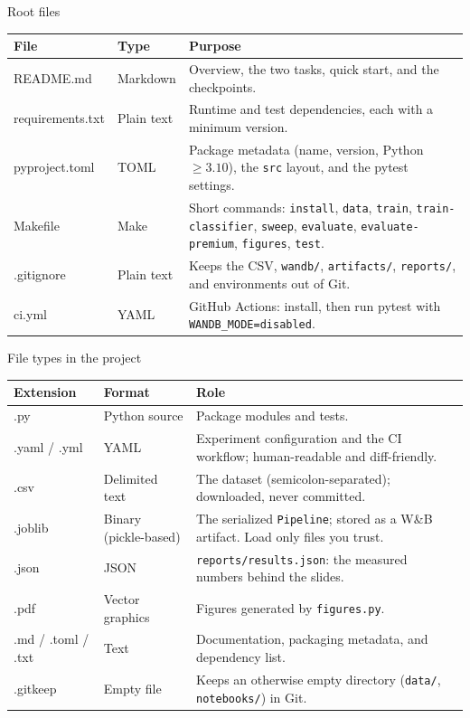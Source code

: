 \begin{frame}{Root files}
\begingroup\footnotesize
\begin{tabularx}{\textwidth}{>{\ttfamily}l l X}
\normalfont\bfseries File & \bfseries Type & \bfseries Purpose \\
\toprule
README.md & Markdown & Overview, the two tasks, quick start, and the checkpoints. \\
\addlinespace[0.3em]
requirements.txt & Plain text & Runtime and test dependencies, each with a minimum version. \\
\addlinespace[0.3em]
pyproject.toml & TOML & Package metadata (name, version, Python $\ge 3.10$), the \texttt{src} layout, and the pytest settings. \\
\addlinespace[0.3em]
Makefile & Make & Short commands: \texttt{install}, \texttt{data}, \texttt{train}, \texttt{train-classifier}, \texttt{sweep}, \texttt{evaluate}, \texttt{evaluate-premium}, \texttt{figures}, \texttt{test}. \\
\addlinespace[0.3em]
.gitignore & Plain text & Keeps the CSV, \texttt{wandb/}, \texttt{artifacts/}, \texttt{reports/}, and environments out of Git. \\
\addlinespace[0.3em]
ci.yml & YAML & GitHub Actions: install, then run pytest with \texttt{WANDB\_MODE=disabled}. \\
\bottomrule
\end{tabularx}
\par\endgroup
\coursefooter
\end{frame}

\begin{frame}{File types in the project}
\begingroup\footnotesize
\begin{tabularx}{\textwidth}{>{\ttfamily}l l X}
\normalfont\bfseries Extension & \bfseries Format & \bfseries Role \\
\toprule
.py & Python source & Package modules and tests. \\
\addlinespace[0.25em]
.yaml / .yml & YAML & Experiment configuration and the CI workflow; human-readable and diff-friendly. \\
\addlinespace[0.25em]
.csv & Delimited text & The dataset (semicolon-separated); downloaded, never committed. \\
\addlinespace[0.25em]
.joblib & Binary (pickle-based) & The serialized \texttt{Pipeline}; stored as a W\&B artifact. Load only files you trust. \\
\addlinespace[0.25em]
.json & JSON & \texttt{reports/results.json}: the measured numbers behind the slides. \\
\addlinespace[0.25em]
.pdf & Vector graphics & Figures generated by \texttt{figures.py}. \\
\addlinespace[0.25em]
.md / .toml / .txt & Text & Documentation, packaging metadata, and dependency list. \\
\addlinespace[0.25em]
.gitkeep & Empty file & Keeps an otherwise empty directory (\texttt{data/}, \texttt{notebooks/}) in Git. \\
\bottomrule
\end{tabularx}
\par\endgroup
\coursefooter
\end{frame}

